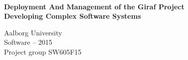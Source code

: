 \thispagestyle{empty}
\begin{center}
\vspace*{\fill}
    \hrulefill\newline\\
    \vspace*{0.35cm}
    {\Large \textbf{Deployment And Management of the Giraf Project}}\\
    \vspace*{0.5cm}
    {\large \textbf{Developing Complex Software Systems}}\\
    \vspace*{0.35cm}
    \hrulefill\newline
    
    Aalborg University\\
    Software -- 2015\\
    Project group SW605F15\\
\end{center}

\vfill

\newpage\null\thispagestyle{empty}\newpage

